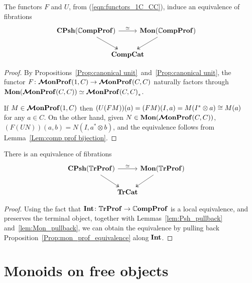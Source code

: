 \documentclass[12pt,oneside,article,draft]{memoir}
\begin{document}
\begin{proposition}\label{Prop:mon_prof_equivalence}
   The functors $F$ and $U$, from (\ref{eqn:functors_1C_CC}), induce an equivalence of fibrations
   \begin{equation*}
      \begin{tikzcd}[column sep=-1.5em]
         \CPsh(\dCompProf) \ar[rr,"\equiv"] \ar[dr,two heads]
            && \Mon(\dCompProf) \ar[dl,two heads] \\
            & \CompCat &
      \end{tikzcd}
   \end{equation*}
\end{proposition}
\begin{proof}
   By Propositions~\ref{Prop:canonical unit}~and~\ref{Prop:canonical unit}, the functor
   $F\colon\bm{\mathcal{M}}\mathbf{onProf}(1, C) \to \bm{\mathcal{M}}\mathbf{onProf}(C, C)$ naturally factors through
   $\mathbf{Mon}(\bm{\mathcal{M}}\mathbf{onProf}(C, C))\simeq\bm{\mathcal{M}}\mathbf{onProf}{(C, C)}_*$.

   If $M\in\bm{\mathcal{M}}\mathbf{onProf}(1, C)$ then $(U(FM))(a)=(FM)(I,a)=M(I^*\otimes a)\cong M(a)$ for any
   $a\in C$. On the other hand, given $N\in\mathbf{Mon}(\bm{\mathcal{M}}\mathbf{onProf}(C, C))$,
   $(F(UN))(a,b)=N(I,a^*\otimes b)$, and the equivalence follows from Lemma~\ref{Lem:comp prof
   bijection}.
\end{proof}

\begin{corollary}\label{cor:Tr_mon_prof_equivalence}
   There is an equivalence of fibrations
   \begin{equation*}
      \begin{tikzcd}[column sep=-.5em]
         \CPsh(\dTrProf) \ar[rr,"\equiv"] \ar[dr,two heads]
            && \Mon(\dTrProf) \ar[dl,two heads] \\
            & \TrCat &
      \end{tikzcd}
   \end{equation*}
\end{corollary}
\begin{proof}
   Using the fact that $\mathbf{Int}\colon\mathbb{T}\mathbf{rProf}\to\mathbb{C}\mathbf{ompProf}$ is a local equivalence, and preserves the
   terminal object, together with Lemmas~\ref{lem:Psh_pullback} and~\ref{lem:Mon_pullback}, we can obtain the
   equivalence by pulling back Proposition~\ref{Prop:mon_prof_equivalence} along $\mathbf{Int}$.
\end{proof}


\section{Monoids on free objects}
\end{document}
